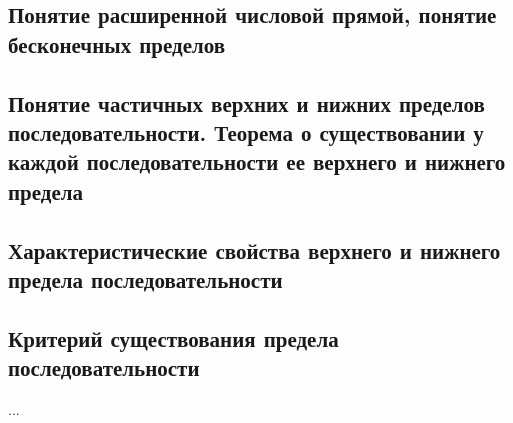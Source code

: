\subsection{Понятие расширенной числовой прямой, понятие бесконечных пределов}
\subsection{Понятие частичных верхних и нижних пределов последовательности. Теорема о существовании у каждой последовательности ее верхнего и нижнего предела}
\subsection{Характеристические свойства верхнего и нижнего предела последовательности}
\subsection{Критерий существования предела последовательности}
...

